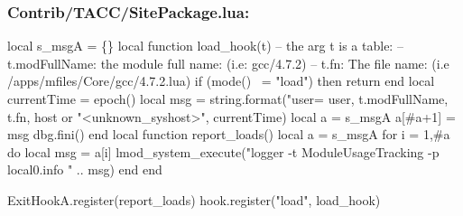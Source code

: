 \documentclass{beamer}
\begin{document}
\begin{frame}[fragile]
  \frametitle{Contrib/TACC/SitePackage.lua: }
    {\tiny
\begin{semiverbatim}
local s\_msgA = \{\}
local function load_hook(t)
   -- the arg t is a table:
   --     t.modFullName:  the module full name: (i.e: gcc/4.7.2)
   --     t.fn:           The file name: (i.e /apps/mfiles/Core/gcc/4.7.2.lua)
   if (mode() ~= "load") then return end
   local currentTime = epoch()
   local msg         = string.format("user=%
                                     user, t.modFullName, t.fn, 
                                     host or "<unknown_syshost>", currentTime)
   local a           = s\_msgA
   a[#a+1]           = msg
   dbg.fini()
end
local function report_loads()
   local a = s\_msgA
   for i = 1,#a do
      local msg = a[i]
      lmod_system_execute("logger -t ModuleUsageTracking -p local0.info " .. msg)
   end
end

ExitHookA.register(report_loads)
hook.register("load",           load_hook)
\end{semiverbatim}
    }
\end{frame}
\end{document}
